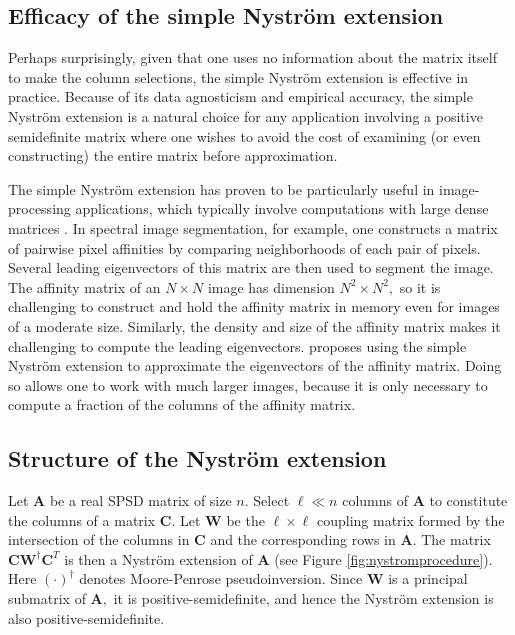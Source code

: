 \documentclass[11pt,letterpaper,twoside,reqno,nosumlimits]{amsart}
\def\pinv{\dagger}
\def\transp{T}
\newcommand{\mat}[1]{\ensuremath{\mathbf{#1}}}
\theoremstyle{remark}
\begin{document}
\subsection{Efficacy of the simple Nystr\"om extension}
Perhaps surprisingly, given that one uses no information about the matrix itself to make the column selections, the simple Nystr\"om extension is effective in practice. Because of its data agnosticism and empirical accuracy, the simple Nystr\"om extension is a natural choice for any application involving a positive semidefinite matrix where one wishes to avoid the cost of examining (or even constructing) the entire matrix before approximation. 

The simple Nystr\"om extension has proven to be particularly useful in image-processing applications, which typically involve computations with large dense matrices \cite{BCFM04, WDTLG09, BF11}. In spectral image segmentation, for example, one constructs a matrix of pairwise pixel affinities by comparing neighborhoods of each pair of pixels. Several leading eigenvectors of this matrix are then used to segment the image. The affinity matrix of an $N \times N$ image has dimension $N^2 \times N^2,$ so it is challenging to construct and hold the affinity matrix in memory even for images of a moderate size. Similarly, the density and size of the affinity matrix makes it challenging to compute the leading eigenvectors. \cite{BCFM04} proposes using the simple Nystr\"om extension to approximate the eigenvectors of the affinity matrix. Doing so allows one to work with much larger images, because it is only necessary to compute a fraction of the columns of the affinity matrix.  

\subsection{Structure of the Nystr\"om extension} Let $\mat{A}$ be a real SPSD matrix of size $n.$ Select $\ell \ll n$ columns of $\mat{A}$ to constitute the columns of a matrix $\mat{C}.$ Let $\mat{W}$ be the $\ell \times \ell$ coupling matrix formed by the intersection of the columns in $\mat{C}$ and the corresponding rows in $\mat{A}.$ The matrix $\mat{C} \mat{W}^\pinv \mat{C}^\transp$ is then a Nystr\"om extension of $\mat{A}$ (see Figure \ref{fig:nystromprocedure}). Here $(\cdot)^\pinv$ denotes Moore-Penrose pseudoinversion. Since $\mat{W}$ is a principal submatrix of $\mat{A},$ it is positive-semidefinite, and hence the Nystr\"om extension is also positive-semidefinite.
\end{document}
